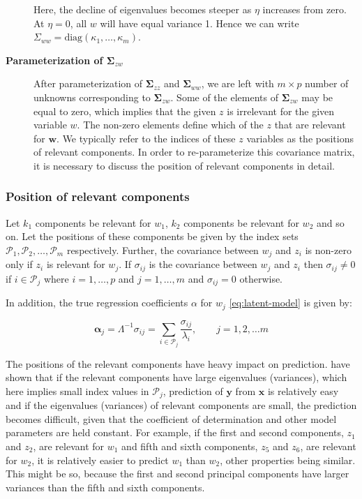 \documentclass[review]{elsarticle}
\theoremstyle{definition}
\theoremstyle{definition}
\theoremstyle{definition}
\theoremstyle{remark}
\begin{document}
\begin{description}
Here, the decline of eigenvalues becomes steeper as \(\eta\) increases
from zero. At \(\eta = 0\), all \(w\) will have equal variance 1. Hence
we can write \(\Sigma_{ww} = \text{diag}(\kappa_1, \ldots, \kappa_m)\).
\item[\textbf{Parameterization of \(\boldsymbol{\Sigma}_{zw}\)}]
After parameterization of \(\boldsymbol{\Sigma}_{zz}\) and
\(\boldsymbol{\Sigma}_{ww}\), we are left with \(m \times p\) number of
unknowns corresponding to \(\boldsymbol{\Sigma}_{zw}\). Some of the
elements of \(\boldsymbol{\Sigma}_{zw}\) may be equal to zero, which
implies that the given \(z\) is irrelevant for the given variable \(w\).
The non-zero elements define which of the \(z\) that are relevant for
\(\mathbf{w}\). We typically refer to the indices of these \(z\)
variables as the positions of relevant components. In order to
re-parameterize this covariance matrix, it is necessary to discuss the
position of relevant components in detail.
\end{description}

\subsubsection{Position of relevant
components}\label{position-of-relevant-components}

Let \(k_1\) components be relevant for \(w_1\), \(k_2\) components be
relevant for \(w_2\) and so on. Let the positions of these components be
given by the index sets
\(\mathcal{P}_1, \mathcal{P}_2, \ldots, \mathcal{P}_m\) respectively.
Further, the covariance between \(w_j\) and \(z_i\) is non-zero only if
\(z_i\) is relevant for \(w_j\). If \(\sigma_{ij}\) is the covariance
between \(w_j\) and \(z_i\) then \(\sigma_{ij} \ne 0\) if
\(i \in \mathcal{P}_j\) where \(i = 1, \ldots, p\) and
\(j = 1, \ldots, m\) and \(\sigma_{ij} = 0\) otherwise.

In addition, the true regression coefficients \(\alpha\) for \(w_j\)
\eqref{eq:latent-model} is given by:

\[
\boldsymbol{\alpha}_j = \Lambda^{-1} \sigma_{ij} = \sum_{i \in \mathcal{P}_j}\frac{\sigma_{ij}}{\lambda_i},\qquad j = 1, 2, \ldots m
\]

The positions of the relevant components have heavy impact on
prediction. \citet{helland1994comparison} have shown that if the
relevant components have large eigenvalues (variances), which here
implies small index values in \(\mathcal{P}_j\), prediction of
\(\mathbf{y}\) from \(\mathbf{x}\) is relatively easy and if the
eigenvalues (variances) of relevant components are small, the prediction
becomes difficult, given that the coefficient of determination and other
model parameters are held constant. For example, if the first and second
components, \(z_1\) and \(z_2\), are relevant for \(w_1\) and fifth and
sixth components, \(z_5\) and \(z_6\), are relevant for \(w_2\), it is
relatively easier to predict \(w_1\) than \(w_2\), other properties
being similar. This might be so, because the first and second principal
components have larger variances than the fifth and sixth components.
\end{document}
